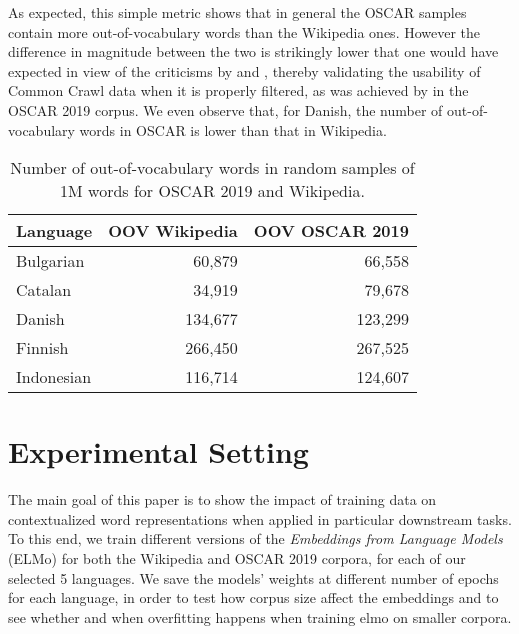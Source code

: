 As expected, this simple metric shows that in general the OSCAR samples contain more out-of-vocabulary words than the Wikipedia ones. However the difference in magnitude between the two is strikingly lower that one would have expected in view of the criticisms by \citet{trinh-le-2018-a} and \citet{radford-etal-2019-language}, thereby validating the usability of Common Crawl data when it is properly filtered, as was achieved by in the OSCAR 2019 corpus. We even observe that, for Danish, the number of out-of-vocabulary words in OSCAR is lower than that in Wikipedia.

\begin{table}[t]
    \centering\small
    \begin{tabular}{lrr}\toprule
        Language   & \multicolumn{1}{l}{OOV Wikipedia} & \multicolumn{1}{l}{OOV OSCAR 2019} \\ \midrule
        Bulgarian  & 60,879                            & 66,558                        \\
        Catalan    & 34,919                            & 79,678                        \\
        Danish     & 134,677                           & 123,299                       \\
        Finnish    & 266,450                           & 267,525                       \\
        Indonesian & 116,714                           & 124,607                       \\
        \bottomrule
    \end{tabular}
    \caption{Number of out-of-vocabulary words in random samples of 1M words for OSCAR 2019 and Wikipedia.}
    \label{tab:OOV}
\end{table}

\section{Experimental Setting}

The main goal of this paper is to show the impact of training data on contextualized word representations when applied in particular downstream tasks. To this end, we train different versions of the \emph{Embeddings from Language Models} (ELMo) \citep{peters-etal-2018-deep} for both the Wikipedia and OSCAR 2019 corpora, for each of our selected 5 languages. We save the models' weights at different number of epochs for each language, in order to test how corpus size affect the embeddings and to see whether and when overfitting happens when training elmo on smaller corpora.

